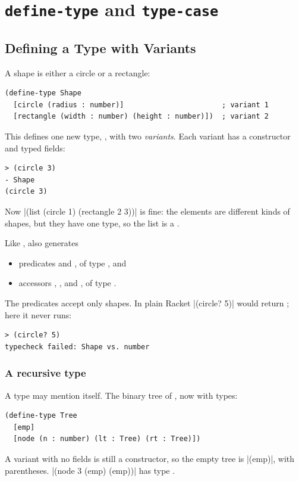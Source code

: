 \section{\texttt{define-type} and \texttt{type-case}}
\label{sec:definetype}

\subsection{Defining a Type with Variants}

A shape is either a circle or a rectangle:
\begin{lstlisting}
(define-type Shape
  [circle (radius : number)]                       ; variant 1
  [rectangle (width : number) (height : number)])  ; variant 2
\end{lstlisting}
This defines one new type, , with two \emph{variants}. Each variant has a constructor and typed fields:
\begin{lstlisting}[style=repl]
> (circle 3)
- Shape
(circle 3)
\end{lstlisting}
Now \rkt|(list (circle 1) (rectangle 2 3))| is fine: the elements are different kinds of shapes, but they have one type, so the list is a .

Like ,  also generates
\begin{itemize}
  \item predicates  and , of type , and
  \item accessors , , and , of type .
\end{itemize}
The predicates accept only shapes. In plain Racket \rkt|(circle? 5)| would return ; here it never runs:
\begin{lstlisting}[style=repl]
> (circle? 5)
typecheck failed: Shape vs. number
\end{lstlisting}

\subsubsection{A recursive type} A type may mention itself. The binary tree of , now with types:
\begin{lstlisting}
(define-type Tree
  [emp]
  [node (n : number) (lt : Tree) (rt : Tree)])
\end{lstlisting}
A variant with no fields is still a constructor, so the empty tree is \rkt|(emp)|, with parentheses. \rkt|(node 3 (emp) (emp))| has type .

